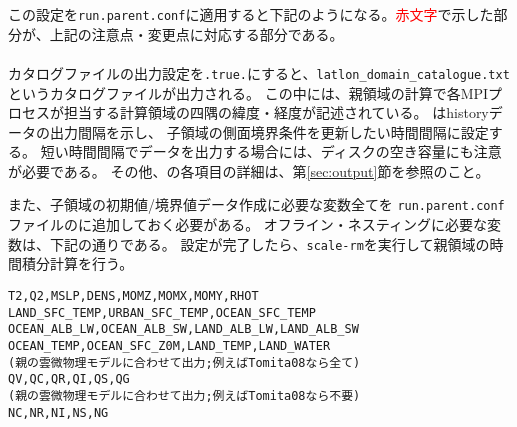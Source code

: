 この設定を\verb|run.parent.conf|に適用すると下記のようになる。\textcolor{red}{赤文字}で示した部分が、上記の注意点・変更点に対応する部分である。\\

\\

カタログファイルの出力設定を\verb|.true.|にすると、\verb|latlon_domain_catalogue.txt|というカタログファイルが出力される。
この中には、親領域の計算で各MPIプロセスが担当する計算領域の四隅の緯度・経度が記述されている。
はhistoryデータの出力間隔を示し、
子領域の側面境界条件を更新したい時間間隔に設定する。
短い時間間隔でデータを出力する場合には、ディスクの空き容量にも注意が必要である。
その他、の各項目の詳細は、第\ref{sec:output}節を参照のこと。

また、子領域の初期値/境界値データ作成に必要な変数全てを
\verb|run.parent.conf|ファイルのに追加しておく必要がある。
オフライン・ネスティングに必要な変数は、下記の通りである。
設定が完了したら、\verb|scale-rm|を実行して親領域の時間積分計算を行う。

\begin{alltt}
  T2, Q2, MSLP, DENS, MOMZ, MOMX, MOMY, RHOT
  LAND_SFC_TEMP, URBAN_SFC_TEMP, OCEAN_SFC_TEMP
  OCEAN_ALB_LW, OCEAN_ALB_SW, LAND_ALB_LW, LAND_ALB_SW
  OCEAN_TEMP, OCEAN_SFC_Z0M, LAND_TEMP, LAND_WATER
(親の雲微物理モデルに合わせて出力; 例えばTomita08なら全て)
  QV, QC, QR, QI, QS, QG
(親の雲微物理モデルに合わせて出力; 例えばTomita08なら不要)
  NC, NR, NI, NS, NG
\end{alltt}



